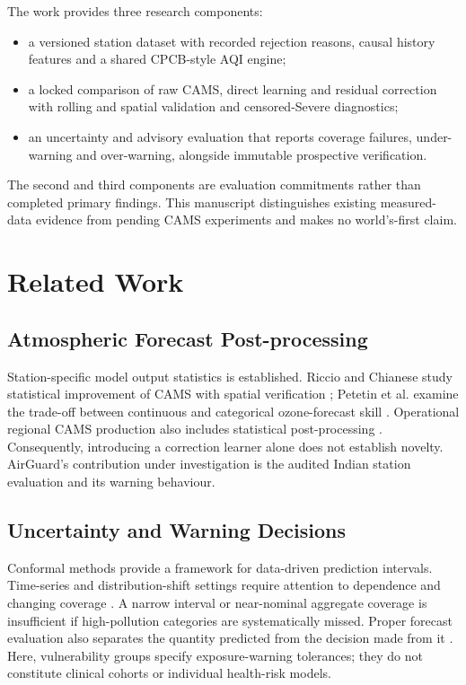 \documentclass[journal]{IEEEtran}
\begin{document}
The work provides three research components:
\begin{itemize}
\item a versioned station dataset with recorded rejection reasons, causal
history features and a shared CPCB-style AQI engine;
\item a locked comparison of raw CAMS, direct learning and residual
correction with rolling and spatial validation and censored-Severe diagnostics;
\item an uncertainty and advisory evaluation that reports coverage failures,
under-warning and over-warning, alongside immutable prospective verification.
\end{itemize}
The second and third components are evaluation commitments rather than
completed primary findings. This manuscript distinguishes existing measured-data
evidence from pending CAMS experiments and makes no world's-first claim.

\section{Related Work}
\subsection{Atmospheric Forecast Post-processing}
Station-specific model output statistics is established. Riccio and Chianese
study statistical improvement of CAMS with spatial verification
\cite{riccio2024mos}; Petetin et al. examine the trade-off between continuous
and categorical ozone-forecast skill \cite{petetin2022mos}. Operational
regional CAMS production also includes statistical post-processing
\cite{colette2025cams}. Consequently, introducing a correction learner alone
does not establish novelty. AirGuard's contribution under investigation is
the audited Indian station evaluation and its warning behaviour.

\subsection{Uncertainty and Warning Decisions}
Conformal methods provide a framework for data-driven prediction intervals.
Time-series and distribution-shift settings require attention to dependence
and changing coverage \cite{xu2021enbpi,gibbs2021aci}. A narrow interval or
near-nominal aggregate coverage is insufficient if high-pollution categories
are systematically missed. Proper forecast evaluation also separates the
quantity predicted from the decision made from it \cite{gneiting2007scoring}.
Here, vulnerability groups specify exposure-warning tolerances; they do not
constitute clinical cohorts or individual health-risk models.
\end{document}
